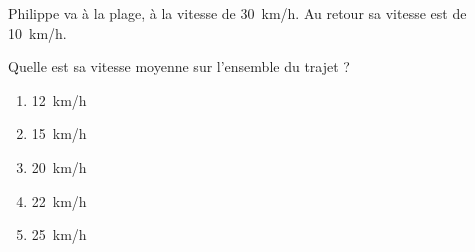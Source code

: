 Philippe va à la plage, à la vitesse de 30~km/h. Au retour sa vitesse est de 10~km/h.\par Quelle est sa vitesse moyenne sur l'ensemble du trajet ?
\begin{multicols}{5}
  \begin{enumerate}[A/]
  \item 12~km/h
  \item 15~km/h
  \item 20~km/h
  \item 22~km/h
  \item 25~km/h
  \end{enumerate}
\end{multicols}